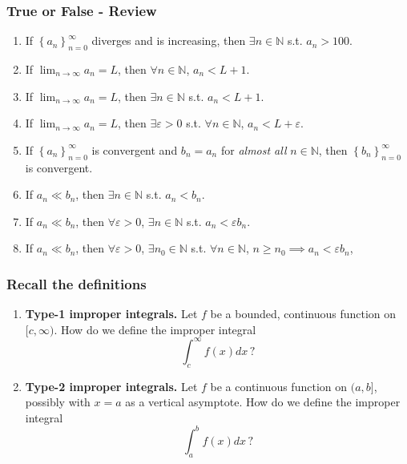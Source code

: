 \documentclass[14pt]{beamer}
\begin{document}
\begin{frame}[t]
	\fontsize{13}{13}\selectfont
	\frametitle{True or False - Review}

	\begin{enumerate}
		\item If $\displaystyle \left\{ a_{n} \right\}_{n=0}^{\infty}$ diverges and is
			increasing, then $\exists n \in \mathbb{N}$ s.t. $a_{n}> 100$.
			\vfill

		\item If $\displaystyle \lim_{n \to \infty}a_{n}= L$, then
			$\forall n \in \mathbb{N}$, $\displaystyle a_{n}< L+1$.
			\vfill

		\item If $\displaystyle \lim_{n \to \infty}a_{n}= L$, then
			$\exists n \in \mathbb{N}$ s.t. $\displaystyle a_{n}< L+1$.
			\vfill

		\item If $\displaystyle \lim_{n \to \infty}a_{n}= L$, then
			$\exists \varepsilon>0$ s.t. $\forall n \in \mathbb{N}$,
			$\displaystyle a_{n}< L+\varepsilon$.
			\vfill

		\item If $\left\{ a_{n} \right\}_{n=0}^{\infty}$ is convergent and $b_{n}=a_{n}$
			for \emph{almost all} $n \in \mathbb{N}$, then $\left\{ b_{n} \right\}_{n=0}
			^{\infty}$ is convergent.
			\vfill

		\item If $a_{n}\ll b_{n}$, then $\exists n \in \mathbb{N}$ s.t. $a_{n}< b_{n}$.
			\vfill

		\item If $a_{n}\ll b_{n}$, then $\forall \varepsilon >0$, $\exists n \in \mathbb{N}$
			s.t. $a_{n}< \varepsilon b_{n}$.
			\vfill

		\item If $a_{n}\ll b_{n}$, then $\forall \varepsilon >0$, $\exists n_{0}\in \mathbb{N}$
			s.t. $\forall n \in \mathbb{N}$, $n \geq n_{0}\implies a_{n}< \varepsilon b
			_{n}$,
			\vfill
	\end{enumerate}
\end{frame}

\begin{frame}[t]
	\frametitle{Recall the definitions}

	\begin{enumerate}
		\item {\bfseries Type-1 improper integrals.} Let $f$ be a bounded,
			continuous function on $\displaystyle [c, \infty)$. How do we define the improper
			integral
			\[
				\int_{c}^{\infty}f(x) dx \, ?
			\]

			\vfill

		\item {\bfseries Type-2 improper integrals.} Let $f$ be a continuous function
			on $\displaystyle (a,b]$, possibly with $x=a$ as a vertical asymptote. How
			do we define the improper integral
			\[
				\int_{a}^{b}f(x) dx \, ?
			\]

			\vfill
	\end{enumerate}
\end{frame}
\end{document}
